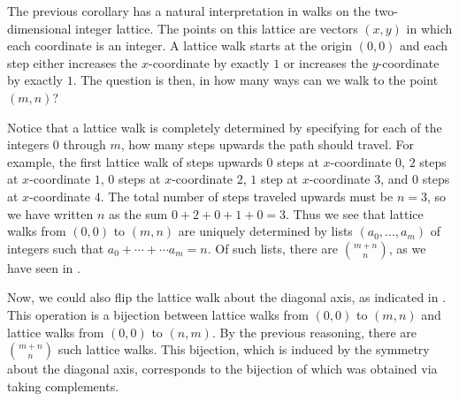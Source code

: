 \begin{remark}
  The previous corollary has a natural interpretation in walks on the two-dimensional integer lattice. The points on this lattice are vectors $(x,y)$ in which each coordinate is an integer. A lattice walk starts at the origin $(0,0)$ and each step either increases the $x$-coordinate by exactly $1$ or increases the $y$-coordinate by exactly $1$. The question is then, in how many ways can we walk to the point $(m,n)$?

Notice that a lattice walk is completely determined by specifying for each of the integers $0$ through $m$, how many steps upwards the path should travel. For example, the first lattice walk of  steps upwards $0$ steps at $x$-coordinate $0$, $2$ steps at $x$-coordinate $1$, $0$ steps at $x$-coordinate $2$, $1$ step at $x$-coordinate $3$, and $0$ steps at $x$-coordinate $4$. The total number of steps traveled upwards must be $n=3$, so we have written $n$ as the sum $0+2+0+1+0=3$. Thus we see that lattice walks from $(0,0)$ to $(m,n)$ are uniquely determined by lists $(a_0,...,a_m)$ of integers such that $a_0+\cdots+\cdots a_m=n$. Of such lists, there are $\binom{m+n}{n}$, as we have seen in .

Now, we could also flip the lattice walk about the diagonal axis, as indicated in . This operation is a bijection between lattice walks from $(0,0)$ to $(m,n)$ and lattice walks from $(0,0)$ to $(n,m)$. By the previous reasoning, there are $\binom{m+n}{n}$ such lattice walks. This bijection, which is induced by the symmetry about the diagonal axis, corresponds to the bijection of  which was obtained via taking complements.
\end{remark}

